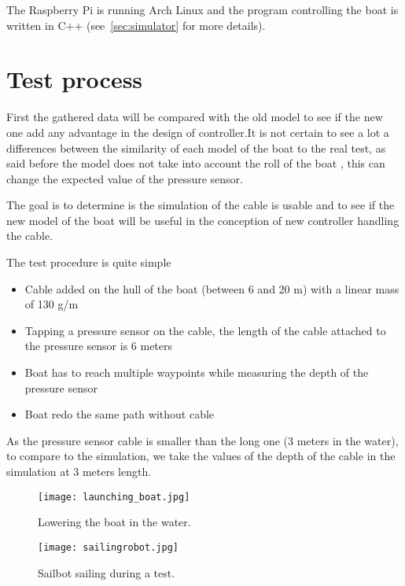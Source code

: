 The Raspberry Pi is running Arch Linux and the program controlling the boat is written in C++ (see~\ref{sec:simulator} for more details).

\section{Test process}

First the gathered data will be compared with the old model to see if the new one add any advantage in the design of controller.It is not certain to see a lot a differences between the similarity of each model of the boat to the real test, as said before the model does not take into account the roll of the boat , this can change the expected value of the pressure sensor.

 The goal is to determine is the simulation of the cable is usable and to see if the new model of the boat will be useful in the conception of new controller handling the cable. 
 
 The test procedure is quite simple
 
\begin{itemize}
\item Cable added on the hull of the boat (between 6 and 20 m) with a linear mass of 130 g/m
\item Tapping a pressure sensor on the cable, the length of the cable attached to the pressure sensor is 6 meters
\item Boat has to reach multiple waypoints while measuring the depth of the pressure sensor
\item Boat redo the same path without cable
\end{itemize}

As the pressure sensor cable is smaller than the long one (3 meters in the water), to compare to the simulation, we take the values of the depth of the cable in the simulation at 3 meters length.


\begin{figure}[H]
\centering
    \begin{minipage}[b]{0.4\textwidth}
    \centering
    \texttt{[image: launching\_boat.jpg]}
    \caption{Lowering the boat in the water.}
    \label{fig:lowerboat}
    \end{minipage}
    \hfill
    \begin{minipage}[b]{0.45\textwidth}
    \centering
    \texttt{[image: sailingrobot.jpg]}
    \caption{Sailbot sailing during a test.}
    \label{fig:sailbot_test}
    \end{minipage}
\end{figure}


